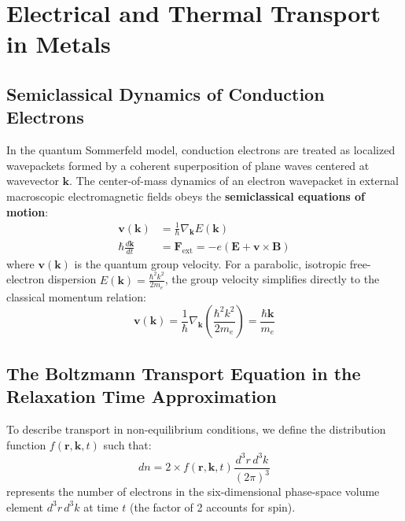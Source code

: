 \documentclass[11pt,a4paper]{article}
\newcommand{\vb}[1]{\mathbf{#1}}
\begin{document}
\clearpage


\section{Electrical and Thermal Transport in Metals}
\label{sec:transport_phenomena}

\subsection{Semiclassical Dynamics of Conduction Electrons}
In the quantum Sommerfeld model, conduction electrons are treated as localized wavepackets formed by a coherent superposition of plane waves centered at wavevector $\vb{k}$. The center-of-mass dynamics of an electron wavepacket in external macroscopic electromagnetic fields obeys the \textbf{semiclassical equations of motion}:
\begin{align}
\vb{v}(\vb{k}) &= \frac{1}{\hbar}\nabla_{\vb{k}} E(\vb{k}) \label{eq:group_velocity} \\
\hbar \frac{d\vb{k}}{dt} &= \vb{F}_{\mathrm{ext}} = -e\left( \vb{E} + \vb{v}\times\vb{B} \right) \label{eq:semiclassical_acceleration}
\end{align}
where $\vb{v}(\vb{k})$ is the quantum group velocity. For a parabolic, isotropic free-electron dispersion $E(\vb{k}) = \frac{\hbar^2 k^2}{2m_e}$, the group velocity simplifies directly to the classical momentum relation:
\begin{equation}
\vb{v}(\vb{k}) = \frac{1}{\hbar}\nabla_{\vb{k}}\left(\frac{\hbar^2 k^2}{2m_e}\right) = \frac{\hbar \vb{k}}{m_e}
\end{equation}

\subsection{The Boltzmann Transport Equation in the Relaxation Time Approximation}
To describe transport in non-equilibrium conditions, we define the distribution function $f(\vb{r}, \vb{k}, t)$ such that:
\begin{equation}
dn = 2 \times f(\vb{r}, \vb{k}, t) \frac{d^3r\, d^3k}{(2\pi)^3}
\end{equation}
represents the number of electrons in the six-dimensional phase-space volume element $d^3r\, d^3k$ at time $t$ (the factor of 2 accounts for spin).
\end{document}
